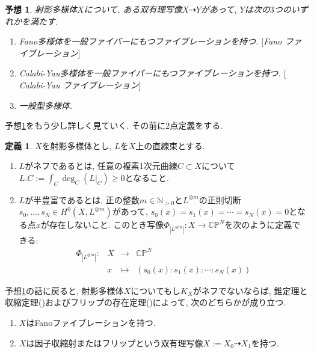 \documentclass[12pt]{amsart}
\newtheorem{conj}[thm]{予想}
\theoremstyle{definition}
\newtheorem{defn}[thm]{定義}
\theoremstyle{remark}
\newcommand{\N}{\mathbb{N}}
\newcommand{\C}{\mathbb{C}}
\begin{document}
\begin{conj}
\label{classification}
射影多様体$X$について, ある双有理写像$X \dashrightarrow Y$があって, $Y$は次の$3$つのいずれかを満たす.
 \begin{enumerate}
\renewcommand{\labelenumi}{$(\arabic{enumi})$.}
 \setlength{\parskip}{0cm} %
  \setlength{\itemsep}{0cm}
\item Fano多様体を一般ファイバーにもつファイブレーションを持つ. $[$Fano ファイブレーション$]$
\item Calabi-Yau多様体を一般ファイバーにもつファイブレーションを持つ. $[$Calabi-Yau ファイブレーション$]$
\item 一般型多様体.
\end{enumerate}
\end{conj}

予想\ref{classification}をもう少し詳しく見ていく. その前に2点定義をする.
\begin{defn}
\label{nef_semiample}
$X$を射影多様体とし, $L$を$X$上の直線束とする.
\begin{enumerate}
\renewcommand{\labelenumi}{$(\arabic{enumi})$.}
 \setlength{\parskip}{0cm} %
  \setlength{\itemsep}{0cm}
\item $L$がネフであるとは, 任意の複素1次元曲線$C \subset X$について$L.C := \int_{C} \deg_{C}(L|_{C}) \ge 0$となること.
\item $L$が半豊富であるとは, 正の整数$m \in \N_{>0}$と$L^{\otimes m}$の正則切断$s_0, \ldots, s_{N} \in H^{0}(X, L^{\otimes m})$があって, $s_{0}(x) =s_{1}(x) = \cdots = s_{N}(x)=0$となる点$x$が存在しないこと. 
このとき写像$\Phi_{|L^{\otimes m}|}:  X\rightarrow \C \mathbb{P}^N$を次のように定義できる:
 $$
\begin{array}{cccc}
\Phi_{|L^{\otimes m}|}: &X& \rightarrow & \C \mathbb{P}^N \\
&x& \longmapsto & (s_{0}(x) : s_{1}(x) : \cdots: s_{N}(x))
\end{array}
$$
\end{enumerate}
\end{defn}


予想\ref{classification}の話に戻ると, 射影多様体$X$についてもし$K_X$がネフでないならば, 錐定理と収縮定理(\cite[Theorem 3.7]{KM98})およびフリップの存在定理(\cite[Corollary 1.4.1]{BCHM})によって, 次のどちらかが成り立つ.
\begin{enumerate}
\renewcommand{\labelenumi}{$(\arabic{enumi})$.}
 \setlength{\parskip}{0cm} %
  \setlength{\itemsep}{0cm}
\item $X$はFanoファイブレーションを持つ.
\item $X$は因子収縮射またはフリップという双有理写像$X:=X_{0} \dashrightarrow X_1$を持つ. 
\end{enumerate}
\end{document}

